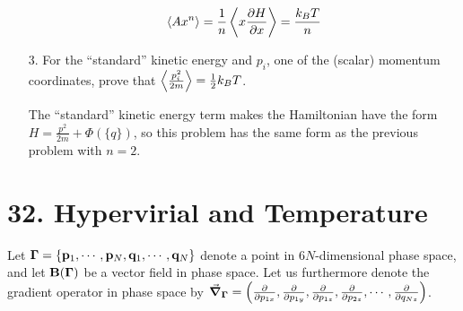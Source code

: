 \documentclass[a4paper,twoside]{article}
\begin{document}
\begin{itemize}
\begin{problem}
\begin{equation}
                \ev{A x^n} = \frac{1}{n} \ev{x \pdv{H}{x}} = \frac{k_BT}{n} 
            \end{equation}
        \end{problem}
    \item[3.] For the ``standard'' kinetic energy and $ p_i $, one of the (scalar) momentum coordinates, prove that $ \ev{\frac{p_i^2}{2m}} = \frac{1}{2} k_B T $.
        \begin{problem}
            The ``standard'' kinetic energy term makes the Hamiltonian have the form $ H = \frac{p^2}{2m} + \Phi(\{q\}) $, so this problem has the same form as the previous problem with $ n = 2 $.
        \end{problem}
\end{itemize}

\section*{32. Hypervirial and Temperature}
Let $ \vb{\Gamma} = \{\vb{p}_1,\cdots, \vb{p}_N, \vb{q}_1, \cdots, \vb{q}_N\} $ denote a point in $ 6N $-dimensional phase space, and let $ \vb{B}(\vb{\Gamma}) $ be a vector field in phase space. Let us furthermore denote the gradient operator in phase space by $ \grad_{\vb{\Gamma}} = \left( \pdv{p_{1x}}, \pdv{p_{1y}}, \pdv{p_{1z}}, \pdv{p_{2z}}, \cdots, \pdv{q_{Nz}} \right) $.
\end{document}
